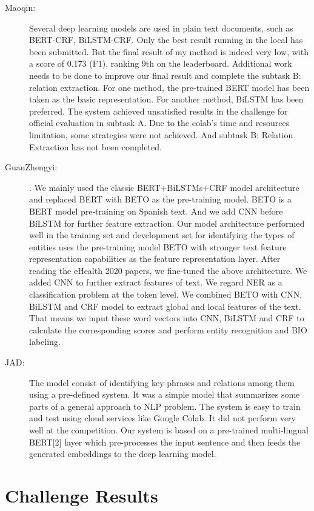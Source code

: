 \documentclass[a4paper,11pt,twocolumn,twoside]{article}
\begin{document}
\begin{description}
  \item[Maoqin:]  Several deep learning models are used in plain text documents, such as
  BERT-CRF, BiLSTM-CRF. Only the best result running in the local has been submitted. But the final
  result of my method is indeed very low, with a score of 0.173 (F1), ranking 9th on the leaderboard.
  Additional work needs to be done to improve our final result and complete the subtask B: relation
  extraction. For one method, the pre-trained BERT model has been taken as the basic representation.
  For another method, BiLSTM has been preferred. The system achieved unsatisfied results in the
  challenge for official evaluation in subtask A. Due to the colab’s time and resources limitation,
  some strategies were not achieved. And subtask B: Relation Extraction has not been completed.

  \item [GuanZhengyi:] . We mainly used the classic BERT+BiLSTMs+CRF model architecture and replaced BERT
  with BETO as the pre-training model. BETO is a BERT model pre-training on Spanish text. And we
  add CNN before BiLSTM for further feature extraction. Our model architecture performed well in the
  training set and development set for identifying the types of entities
  uses the pre-training model BETO with stronger text feature
  representation capabilities as the feature representation layer. After reading the eHealth 2020
  papers, we fine-tuned the above architecture. We added CNN to further extract features of
  text. We regard NER as a classification problem at the token level. We combined BETO with
  CNN, BiLSTM and CRF model to extract global and local features of the text. That means we
  input these word vectors into CNN, BiLSTM and CRF to calculate the corresponding scores and
  perform entity recognition and BIO labeling.

  \item[JAD:] The model consist of identifying key-phrases
  and relations among them using a pre-defined system. It was a simple model that summarizes
  some parts of a general approach to NLP problem. The system is easy to train and test using
  cloud services like Google Colab. It did not perform very well at the competition.
  Our system is based on a pre-trained multi-lingual BERT[2] layer which pre-processes the input sentence and then feeds the generated
embeddings to the deep learning model. 
\end{description}

\section{Challenge Results}\label{sec:results}
\end{document}
